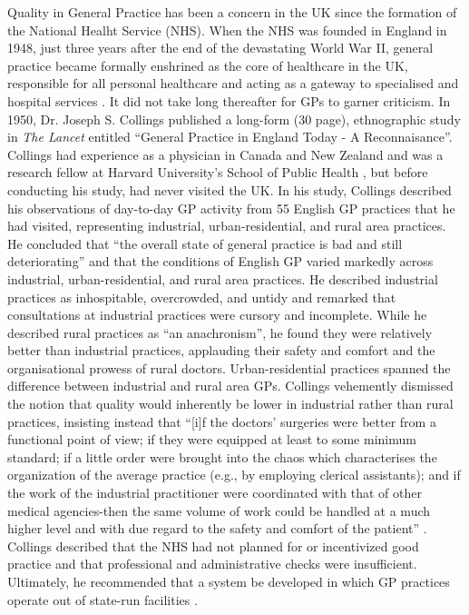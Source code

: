\documentclass[12pt]{article}
\begin{document}
Quality in General Practice has been a concern in the UK since the formation of the National Healht Service (NHS). When the NHS was founded in England in 1948, just three years after the end of the devastating World War II, general practice became formally enshrined as the core of healthcare in the UK, responsible for all personal healthcare and acting as a gateway to specialised and hospital services \citep{goodwinImprovingQualityCare2011}. It did not take long thereafter for GPs to garner criticism. In 1950, Dr. Joseph S. Collings \citep{collingsGENERALPRACTICEENGLAND1950} published a long-form (30 page), ethnographic study in \emph{The Lancet} entitled ``General Practice in England Today - A Reconnaisance''. Collings had experience as a physician in Canada and New Zealand and was a research fellow at Harvard University's School of Public Health \citep{petcheyCollingsReportGeneral1995}, but before conducting his study, had never visited the UK. In his study, Collings described his observations of day-to-day GP activity from 55 English GP practices that he had visited, representing industrial, urban-residential, and rural area practices. He concluded that ``the overall state of general practice is bad and still deteriorating'' and that the conditions of English GP varied markedly across industrial, urban-residential, and rural area practices. He described industrial practices as inhospitable, overcrowded, and untidy and remarked that consultations at industrial practices were cursory and incomplete. While he described rural practices as ``an anachronism'', he found they were relatively better than industrial practices, applauding their safety and comfort and the organisational prowess of rural doctors. Urban-residential practices spanned the difference between industrial and rural area GPs. Collings vehemently dismissed the notion that quality would inherently be lower in industrial rather than rural practices, insisting instead that ``[i]f the doctors' surgeries were better from a functional point of view; if they were equipped at least to some minimum standard; if a little order were brought into the chaos which characterises the organization of the average practice (e.g., by employing clerical assistants); and if the work of the industrial practitioner were coordinated with that of other medical agencies-then the same volume of work could be handled at a much higher level and with due regard to the safety and comfort of the patient'' \citep{collingsGENERALPRACTICEENGLAND1950}. Collings described that the NHS had not planned for or incentivized good practice and that professional and administrative checks were insufficient. Ultimately, he recommended that a system be developed in which GP practices operate out of state-run facilities \citep{fryGeneralPracticePrimary1988}.
\end{document}

